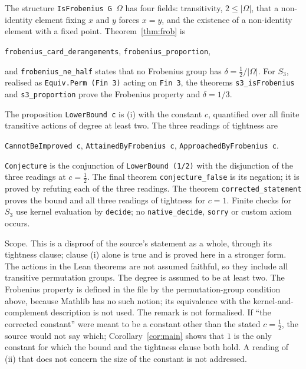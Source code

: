 \documentclass[11pt]{article}
\theoremstyle{remark}
\begin{document}
The structure \texttt{IsFrobenius G $\Omega$} has four fields:
transitivity, $2\le|\Omega|$, that a non-identity element fixing $x$ and
$y$ forces $x=y$, and the existence of a non-identity element with a
fixed point. Theorem~\ref{thm:frob} is
\begin{center}\small
\texttt{frobenius\_card\_derangements},\qquad
\texttt{frobenius\_proportion},
\end{center}
and \texttt{frobenius\_ne\_half} states that no Frobenius group has
$\delta=\tfrac12/|\Omega|$. For $S_3$, realised as
\texttt{Equiv.Perm (Fin 3)} acting on \texttt{Fin 3}, the theorems
\texttt{s3\_isFrobenius} and \texttt{s3\_proportion} prove the Frobenius
property and $\delta=1/3$.

The proposition \texttt{LowerBound c} is (i) with the constant $c$,
quantified over all finite transitive actions of degree at least two.
The three readings of tightness are
\begin{center}\small
\texttt{CannotBeImproved c},\quad
\texttt{AttainedByFrobenius c},\quad
\texttt{ApproachedByFrobenius c}.
\end{center}
\texttt{Conjecture} is the conjunction of \texttt{LowerBound (1/2)}
with the disjunction of the three readings at $c=\tfrac12$. The final
theorem \texttt{conjecture\_false} is its negation; it is proved by
refuting each of the three readings. The theorem
\texttt{corrected\_statement} proves the bound and all three readings
of tightness for $c=1$. Finite checks for $S_3$ use kernel evaluation by
\texttt{decide}; no \texttt{native\_decide}, \texttt{sorry} or custom
axiom occurs.

Scope. This is a disproof of the source's statement as a whole, through
its tightness clause; clause (i) alone is true and is proved here in a
stronger form. The actions in the Lean theorems are not assumed
faithful, so they include all transitive permutation groups. The degree
is assumed to be at least two. The Frobenius property is defined in the
file by the permutation-group condition above, because Mathlib has no
such notion; its equivalence with the kernel-and-complement description
is not used. The remark is not formalised. If ``the corrected
constant'' were meant to be a constant other than the stated
$c=\tfrac12$, the source would not say which; Corollary~\ref{cor:main}
shows that $1$ is the only constant for which the bound and the
tightness clause both hold. A reading of (ii) that does not concern the
size of the constant is not addressed.
\end{document}
